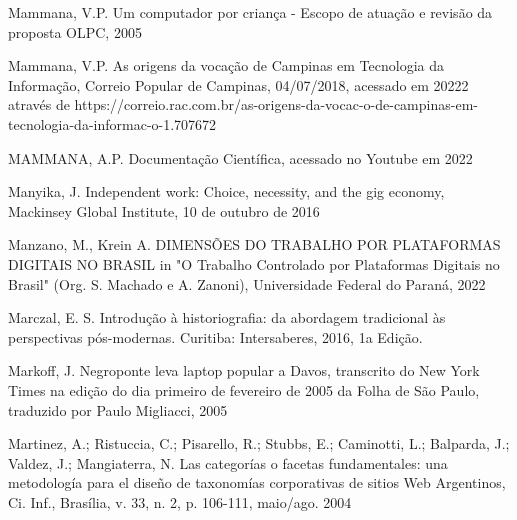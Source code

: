 \begin{flushleft}
[MAMMANA, 2005a] Mammana, V.P. Um computador por criança - Escopo de atuação e revisão da proposta OLPC, 2005
\end{flushleft}


\begin{flushleft}
[MAMMANA, 2018] Mammana, V.P. As origens da vocação de Campinas em Tecnologia da Informação, Correio Popular de Campinas, 04/07/2018, acessado em 20222 através de https://correio.rac.com.br/as-origens-da-vocac-o-de-campinas-em-tecnologia-da-informac-o-1.707672
\end{flushleft}


\begin{flushleft}
[MAMMANA, 2019] MAMMANA, A.P. Documentação Científica, acessado no Youtube em 2022
\end{flushleft}


\begin{flushleft}
[MANYIKA, 2016] Manyika, J. Independent work: Choice, necessity, and the gig economy, Mackinsey Global Institute, 10 de outubro de 2016
\end{flushleft}


\begin{flushleft}
 Manzano, M., Krein A. DIMENSÕES DO TRABALHO POR PLATAFORMAS DIGITAIS NO BRASIL in "O Trabalho Controlado por Plataformas Digitais no Brasil" (Org. S. Machado e A. Zanoni), Universidade Federal do Paraná, 2022
\end{flushleft}


\begin{flushleft}
[MARCZAL, 2016] Marczal, E. S. Introdução à historiografia: da abordagem tradicional às perspectivas pós-modernas. Curitiba: Intersaberes, 2016, 1a Edição.
\end{flushleft}


\begin{flushleft}
[MARKOFF, 2005] Markoff, J. Negroponte leva laptop popular a Davos, transcrito do New York Times na edição do dia primeiro de fevereiro de 2005 da Folha de São Paulo, traduzido por Paulo Migliacci, 2005
\end{flushleft}


\begin{flushleft}
[MARTINEZ et al., 2004] Martinez, A.; Ristuccia, C.; Pisarello, R.; Stubbs, E.; Caminotti, L.; Balparda, J.; Valdez, J.; Mangiaterra, N. Las categorías o facetas fundamentales: una metodología para el diseño de taxonomías corporativas de sitios Web Argentinos, Ci. Inf., Brasília, v. 33, n. 2, p. 106-111, maio/ago. 2004
\end{flushleft}


